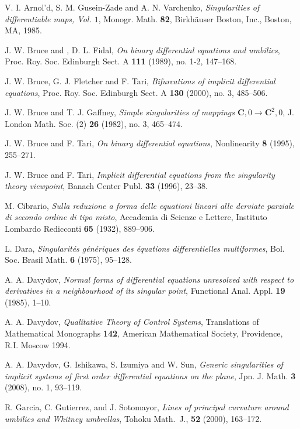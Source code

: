 \documentclass[a4paper, 12pt]{article}
\theoremstyle{definition}
\numberwithin{equation}{section}
\begin{document}
\begin{thebibliography}{99}
V. I. Arnol'd, S. M. Gusein-Zade and A. N. Varchenko,
{\em Singularities of differentiable maps, Vol. $1$},
Monogr. Math. {\bf 82}, Birkh\"auser Boston, Inc., Boston, MA, 1985.

J. W. Bruce and , D. L. Fidal,
{\itshape On binary differential equations and umbilics},
Proc. Roy. Soc. Edinburgh Sect. A {\bf 111} (1989), no. 1-2, 147--168.

J. W. Bruce, G. J. Fletcher and F. Tari,
{\itshape Bifurcations of implicit differential equations},
Proc. Roy. Soc. Edinburgh Sect. A {\bf 130} (2000), no. 3, 485--506.

J. W. Bruce and T. J. Gaffney,
{\it Simple singularities of mappings\/ 
$\boldsymbol{C},0\to\boldsymbol{C}^2,0$},
J. London Math. Soc. (2) {\bf 26} (1982), no. 3, 465--474.

J. W. Bruce and F. Tari,
{\itshape On binary differential equations},
Nonlinearity {\bf 8} (1995), 255--271.

J. W. Bruce and F. Tari,
{\itshape Implicit differential equations from 
the singularity theory viewpoint},
Banach Center Publ. {\bf 33} (1996), 23--38.

M. Cibrario,
{\itshape Sulla reduzione a forma delle equationi lineari 
alle derviate parziale di secondo ordine di tipo misto},
Accademia di Scienze e Lettere, 
Instituto Lombardo Redicconti {\bf 65} (1932), 889--906.

L. Dara, 
{\itshape Singularit\'{e}s g\'{e}n\'{e}riques 
des \'{e}quations differentielles multiformes},
Bol. Soc. Brasil Math. {\bf 6} (1975), 95--128.

A. A. Davydov,
{\itshape Normal forms of differential equations unresolved 
with respect to derivatives in a neighbourhood
of its singular point}, 
Functional Anal. Appl. {\bf 19} (1985), 1--10.

A. A. Davydov,
{\itshape Qualitative Theory of Control Systems},
Translations of Mathematical Monographs {\bf 142}, 
American Mathematical Society, Providence, R.I. Moscow 1994.

A. A. Davydov, G. Ishikawa, S. Izumiya and W. Sun,
{\itshape Generic singularities of implicit systems 
of first order differential equations on the plane},
Jpn. J. Math. {\bf 3} (2008), no. 1, 93--119.

R. Garcia, C. Gutierrez, and J. Sotomayor,
{\itshape Lines of principal curvature
around umbilics and Whitney umbrellas},
Tohoku Math.\ J., {\bf 52} (2000), 163--172.


\end{thebibliography}
\end{document}
